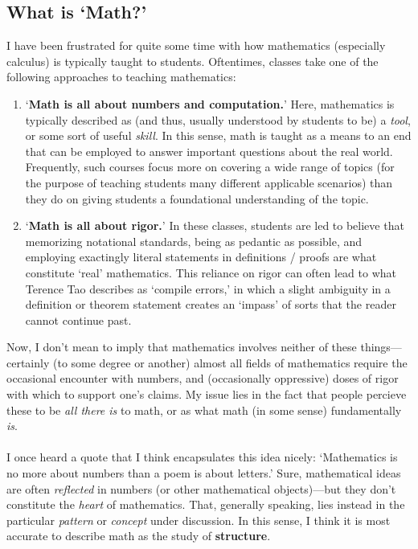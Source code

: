 \documentclass[10pt]{article}
\theoremstyle{definition}
\begin{document}
\subsection{What is `Math?'}
I have been frustrated for quite some time with how mathematics (especially calculus) is typically taught to students.  Oftentimes, classes take one of the following approaches to teaching mathematics:
\begin{enumerate}
    \item `\textbf{Math is all about numbers and computation.}'  Here, mathematics is typically described as (and thus, usually understood by students to be) a \emph{tool}, or some sort of useful \emph{skill}.  In this sense, math is taught as a means to an end that can be employed to answer important questions about the real world.  Frequently, such courses focus more on covering a wide range of topics (for the purpose of teaching students many different applicable scenarios) than they do on giving students a foundational understanding of the topic.  
    \item `\textbf{Math is all about rigor.}'  In these classes, students are led to believe that memorizing notational standards, being as pedantic as possible, and employing exactingly literal statements in definitions / proofs are what constitute `real' mathematics.  This reliance on rigor can often lead to what Terence Tao describes as `compile errors,' in which a slight ambiguity in a definition or theorem statement creates an `impass' of sorts that the reader cannot continue past.
\end{enumerate}
Now, I don't mean to imply that mathematics involves neither of these things---certainly (to some degree or another) almost all fields of  mathematics require the occasional encounter with numbers, and (occasionally oppressive) doses of rigor with which to support one's claims.  My issue lies in the fact that people percieve these to be \emph{all there is} to math, or as what math (in some sense) fundamentally \emph{is}.\\~\\
I once heard a quote that I think encapsulates this idea nicely: `Mathematics is no more about numbers than a poem is about letters.'  Sure, mathematical ideas are often \emph{reflected} in numbers (or other mathematical objects)---but they don't constitute the \emph{heart} of mathematics.  That, generally speaking, lies instead in the particular \emph{pattern} or \emph{concept} under discussion.  In this sense, I think it is most accurate to describe math as the study of \textbf{structure}.  \\~\\
\end{document}
